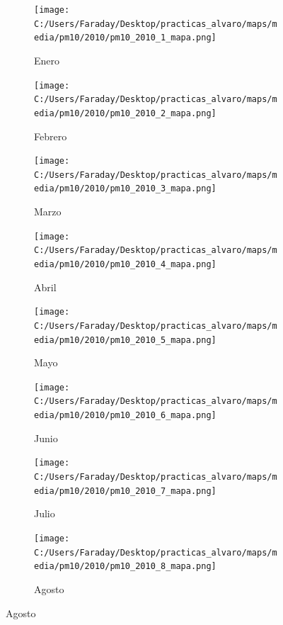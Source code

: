 \documentclass[12pt]{beamer}
\begin{document}
\begin{frame}[squeeze]
\tiny
\begin{figure}[H]
\centering
\begin{subfigure}[H]{0.20\textwidth}
\texttt{[image: C:/Users/Faraday/Desktop/practicas\_alvaro/maps/media/pm10/2010/pm10\_2010\_1\_mapa.png]}
\captionsetup{labelformat=empty}
\caption{\scriptsize Enero}
\label{fig:map-pm10-2010-1}
\end{subfigure}
%
\begin{subfigure}[H]{0.20\textwidth}
\texttt{[image: C:/Users/Faraday/Desktop/practicas\_alvaro/maps/media/pm10/2010/pm10\_2010\_2\_mapa.png]}
\captionsetup{labelformat=empty}
\caption{\scriptsize Febrero}
\label{fig:map-pm10-2010-2}
\end{subfigure}
%
\begin{subfigure}[H]{0.20\textwidth}
\texttt{[image: C:/Users/Faraday/Desktop/practicas\_alvaro/maps/media/pm10/2010/pm10\_2010\_3\_mapa.png]}
\captionsetup{labelformat=empty}
\caption{\scriptsize Marzo}
\label{fig:map-pm10-2010-3}
\end{subfigure}
%
\begin{subfigure}[H]{0.20\textwidth}
\texttt{[image: C:/Users/Faraday/Desktop/practicas\_alvaro/maps/media/pm10/2010/pm10\_2010\_4\_mapa.png]}
\captionsetup{labelformat=empty}
\caption{\scriptsize Abril}
\label{fig:map-pm10-2010-4}
\end{subfigure}

\begin{subfigure}[H]{0.20\textwidth}
\texttt{[image: C:/Users/Faraday/Desktop/practicas\_alvaro/maps/media/pm10/2010/pm10\_2010\_5\_mapa.png]}
\captionsetup{labelformat=empty}
\caption{\scriptsize Mayo}
\label{fig:map-pm10-2010-5}
\end{subfigure}
%
\begin{subfigure}[H]{0.20\textwidth}
\texttt{[image: C:/Users/Faraday/Desktop/practicas\_alvaro/maps/media/pm10/2010/pm10\_2010\_6\_mapa.png]}
\captionsetup{labelformat=empty}
\caption{\scriptsize Junio}
\label{fig:map-pm10-2010-6}
\end{subfigure}
%
\begin{subfigure}[H]{0.20\textwidth}
\texttt{[image: C:/Users/Faraday/Desktop/practicas\_alvaro/maps/media/pm10/2010/pm10\_2010\_7\_mapa.png]}
\captionsetup{labelformat=empty}
\caption{\scriptsize Julio}
\label{fig:map-pm10-2010-7}
\end{subfigure}
%
\begin{subfigure}[H]{0.20\textwidth}
\texttt{[image: C:/Users/Faraday/Desktop/practicas\_alvaro/maps/media/pm10/2010/pm10\_2010\_8\_mapa.png]}
\captionsetup{labelformat=empty}
\caption{\scriptsize Agosto}
\label{fig:map-pm10-2010-8}
\end{subfigure}


\end{figure}
\end{frame}
\end{document}
